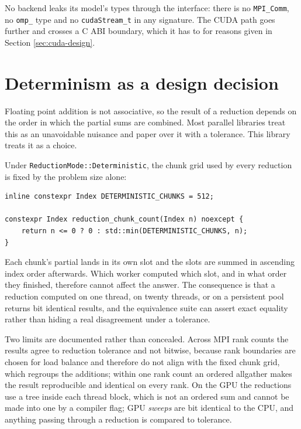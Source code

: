 No backend leaks its model's types through the interface: there is no
\texttt{MPI\_Comm}, no \texttt{omp\_} type and no \texttt{cudaStream\_t} in any
signature. The CUDA path goes further and crosses a C ABI boundary, which it has
to for reasons given in Section \ref{sec:cuda-design}.

\section{Determinism as a design decision}
\label{sec:determinism}

Floating point addition is not associative, so the result of a reduction depends
on the order in which the partial sums are combined. Most parallel libraries
treat this as an unavoidable nuisance and paper over it with a tolerance. This
library treats it as a choice.

Under \texttt{ReductionMode::Deterministic}, the chunk grid used by every
reduction is fixed by the problem size alone:

\begin{lstlisting}[caption={The chunking policy that makes determinism possible}]
inline constexpr Index DETERMINISTIC_CHUNKS = 512;

constexpr Index reduction_chunk_count(Index n) noexcept {
    return n <= 0 ? 0 : std::min(DETERMINISTIC_CHUNKS, n);
}
\end{lstlisting}

Each chunk's partial lands in its own slot and the slots are summed in ascending
index order afterwards. Which worker computed which slot, and in what order they
finished, therefore cannot affect the answer. The consequence is that a
reduction computed on one thread, on twenty threads, or on a persistent pool
returns bit identical results, and the equivalence suite can assert exact
equality rather than hiding a real disagreement under a tolerance.

Two limits are documented rather than concealed. Across MPI rank counts the
results agree to reduction tolerance and not bitwise, because rank boundaries
are chosen for load balance and therefore do not align with the fixed chunk
grid, which regroups the additions; within one rank count an ordered allgather
makes the result reproducible and identical on every rank. On the GPU the
reductions use a tree inside each thread block, which is not an ordered sum and
cannot be made into one by a compiler flag; GPU \emph{sweeps} are bit identical
to the CPU, and anything passing through a reduction is compared to tolerance.

